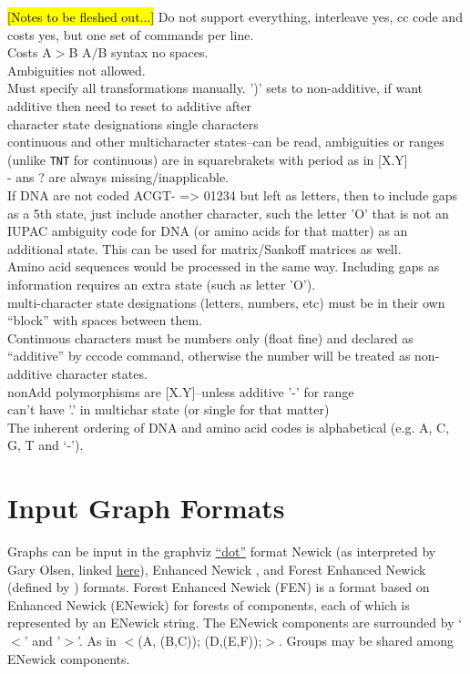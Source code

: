 \documentclass[11pt]{book}
\begin{document}
{{		\hl{[Notes to be fleshed out...]}
		Do not support everything, interleave yes, cc code and costs yes, but one set of commands per line.\\
		Costs A$>$B A$/$B syntax no spaces. \\
		Ambiguities not allowed.  \\
		Must specify all transformations manually.
		')' sets to non-additive, if want additive then need to reset to additive after\\
		character state designations single characters\\
		continuous and other multicharacter states--can be read, ambiguities or ranges (unlike \texttt{TNT} 
		for continuous) are 
		in squarebrakets with period as in [X.Y]\\
		- ans ? are always missing/inapplicable.  \\
		If DNA are not coded ACGT- => 01234 but left as letters, then to include gaps as a 5th state, just 
		include another character, such the letter 'O' that is not an IUPAC 
		ambiguity code for DNA (or amino acids for that matter) as an additional state.  This can be used for 
		matrix/Sankoff matrices as well.\\
		Amino acid sequences would be processed in the same way.  Including gaps as information requires
		an extra state (such as letter 'O').\\ 
		multi-character state designations (letters, numbers, etc) must be in their own ``block'' with spaces 
		between them.\\
		Continuous characters must be numbers only (float fine) and declared as ``additive'' by cccode 
		command, otherwise the number will be treated as non-additive character states. \\
		nonAdd polymorphisms  are [X.Y]--unless  additive '-' for range\\
		can't have '.' in multichar state (or single for that matter)\\
		The inherent ordering of DNA and amino acid codes is alphabetical (e.g. A, C, G, T and `-').
	
\section{Input Graph Formats}
	Graphs can be input in the graphviz \href{https://graphviz.org/}{``dot''} format Newick (as 		
	interpreted by Gary Olsen, linked \href{https://evolution.genetics.washington.edu/phylip/newick_doc.html}
	{here}), Enhanced Newick \cite{Cardonaetal2008}, and Forest Enhanced Newick (defined by 
	\citealp{WheelerPhyloSuperGraphs}) formats.
	Forest Enhanced Newick (FEN) is a format based on Enhanced Newick (ENewick) for 
	forests of components, each of which is represented by an ENewick string.  The ENewick 
	components are surrounded by `$<$' and '$>$'. As in $<$(A, (B,C)); (D,(E,F));$>$.  
	Groups may be shared among ENewick components.
	
}}
\end{document}
